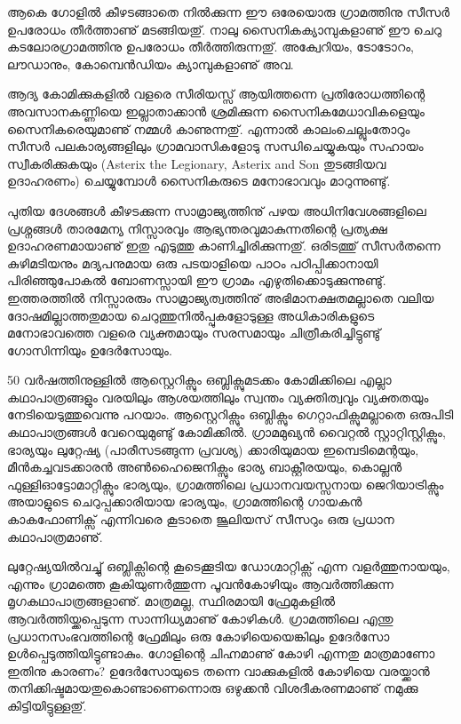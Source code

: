 ആകെ ഗോളില്‍ കീഴടങ്ങാതെ നില്‍ക്കുന്ന ഈ ഒരേയൊരു ഗ്രാമത്തിനു സീസര്‍ ഉപരോധം തീര്‍ത്താണു് മടങ്ങിയതു്. 
നാലു സൈനികക്യാമ്പുകളാണു് ഈ ചെറു കടലോരഗ്രാമത്തിനു ഉപരോധം തീര്‍ത്തിരുന്നതു്. അക്വേറിയം, ടോടോറം, 
ലൗഡാനും, കോമ്പെന്‍ഡിയം ക്യാമ്പുകളാണു് അവ.

ആദ്യ കോമിക്കുകളില്‍ വളരെ സീരിയസ്സ് ആയിത്തന്നെ പ്രതിരോധത്തിന്റെ അവസാനകണ്ണിയെ ഇല്ലാതാക്കാന്‍ 
ശ്രമിക്കുന്ന സൈനികമേധാവികളെയും സൈനികരെയുമാണു് നമ്മള്‍ കാണുന്നതു്. എന്നാല്‍ കാലംചെല്ലുംതോറും 
സീസര്‍ പലകാര്യങ്ങളിലും ഗ്രാമവാസികളോടു സന്ധിചെയ്യുകയും സഹായം സ്വീകരിക്കുകയും (Asterix the
Legionary, Asterix and Son തുടങ്ങിയവ ഉദാഹരണം) ചെയ്യുമ്പോള്‍ സൈനികരുടെ മനോഭാവവും മാറുന്നുണ്ടു്.

പുതിയ ദേശങ്ങള്‍ കീഴടക്കുന്ന സാമ്രാജ്യത്തിനു് പഴയ അധിനിവേശങ്ങളിലെ പ്രശ്നങ്ങള്‍ താരമേന്യ നിസ്സാരവും 
ആഭ്യന്തരവുമാകുന്നതിന്റെ പ്രത്യക്ഷ ഉദാഹരണമായാണു് ഇതു എടുത്തു കാണിച്ചിരിക്കുന്നതു്. ഒരിടത്തു് സീസര്‍തന്നെ 
കുഴിമടിയനും മദ്യപനുമായ ഒരു പടയാളിയെ പാഠം പഠിപ്പിക്കാനായി പിരിഞ്ഞുപോകല്‍ ബോണസ്സായി ഈ ഗ്രാമം 
എഴുതിക്കൊടുക്കുന്നുണ്ടു്. ഇത്തരത്തില്‍ നിസ്സാരരും സാമ്രാജ്യത്വത്തിനു് അഭിമാനക്ഷതമല്ലാതെ വലിയ ദോഷമില്ലാത്തതുമായ 
ചെറുത്തുനില്‍പ്പുകളോടുള്ള അധികാരികളുടെ മനോഭാവത്തെ വളരെ വ്യക്തമായും സരസമായും ചിത്രീകരിച്ചിട്ടുണ്ടു് 
ഗോസിന്നിയും ഉദേര്‍സോയും.

50 വര്‍ഷത്തിനുള്ളില്‍ ആസ്റ്റെറിക്സും ഒബ്ലിക്സുമടക്കം കോമിക്കിലെ എല്ലാ കഥാപാത്രങ്ങളും വരയിലും ആശയത്തിലും സ്വന്തം 
വ്യക്തിത്വവും വ്യക്തതയും നേടിയെടുത്തുവെന്നു പറയാം. ആസ്റ്റെറിക്സും ഒബ്ലിക്സും ഗെറ്റാഫിക്സുമല്ലാതെ ഒരുപിടി കഥാപാത്രങ്ങള്‍ 
വേറെയുമുണ്ടു് കോമിക്കില്‍. ഗ്രാമമുഖ്യന്‍ വൈറ്റല്‍ സ്റ്റാറ്റിസ്റ്റിക്സും, ഭാര്യയും ലുറ്റേഷ്യ (പാരീസടങ്ങുന്ന പ്രവശ്യ) ക്കാരിയുമായ 
ഇമ്പെടിമെന്റയും, മീന്‍കച്ചവടക്കാരന്‍ അണ്‍ഹൈജെനിക്സും ഭാര്യ ബാക്റ്റീരയയും, കൊല്ലന്‍ ഫുള്ളിഓട്ടോമാറ്റിക്സും ഭാര്യയും, 
ഗ്രാമത്തിലെ പ്രധാനവയസ്സനായ ജെറിയാട്രിക്സും അയാളുടെ ചെറുപ്പക്കാരിയായ ഭാര്യയും, ഗ്രാമത്തിന്റെ ഗായകന്‍ 
കാകഫോണിക്സ് എന്നിവരെ കൂടാതെ ജൂലിയസ് സീസറും ഒരു പ്രധാന കഥാപാത്രമാണു്.


ലുറ്റേഷ്യയില്‍വച്ചു് ഒബ്ലിക്സിന്റെ കൂടെക്കൂടിയ ഡോഗ്മാറ്റിക്സ് എന്ന വളര്‍ത്തുനായയും, എന്നും ഗ്രാമത്തെ കൂകിയുണര്‍ത്തുന്ന 
പൂവന്‍കോഴിയും ആവര്‍ത്തിക്കുന്ന മൃഗകഥാപാത്രങ്ങളാണു്. മാത്രമല്ല, സ്ഥിരമായി ഫ്രേമുകളില്‍ ആവര്‍ത്തിയ്ക്കപ്പെടുന്ന 
സാന്നിധ്യമാണു് കോഴികള്‍. ഗ്രാമത്തിലെ എന്തു പ്രധാനസംഭവത്തിന്റെ ഫ്രേമിലും ഒരു കോഴിയെയെങ്കിലും ഉദേര്‍സോ 
ഉള്‍പ്പെടുത്തിയിട്ടുണ്ടാകും. ഗോളിന്റെ ചിഹ്നമാണു് കോഴി എന്നതു മാത്രമാണോ ഇതിനു കാരണം? ഉദേര്‍സോയുടെ തന്നെ 
വാക്കുകളില്‍ കോഴിയെ വരയ്ക്കാന്‍ തനിക്കിഷ്ടമായതുകൊണ്ടാണെന്നൊരു ഒഴുക്കന്‍ വിശദീകരണമാണു് നമുക്കു കിട്ടിയിട്ടുള്ളതു്.

